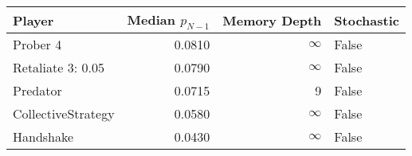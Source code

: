 \begin{tabular}{lrrl}
\toprule
             Player &  Median $p_{N-1}$ &  Memory Depth & Stochastic \\
\midrule
           Prober 4 &            0.0810 &            \(\infty\) &      False \\
  Retaliate 3: 0.05 &            0.0790 &            \(\infty\) &      False \\
           Predator &            0.0715 &             9 &      False \\
 CollectiveStrategy &            0.0580 &            \(\infty\) &      False \\
          Handshake &            0.0430 &            \(\infty\) &      False \\
\bottomrule
\end{tabular}

